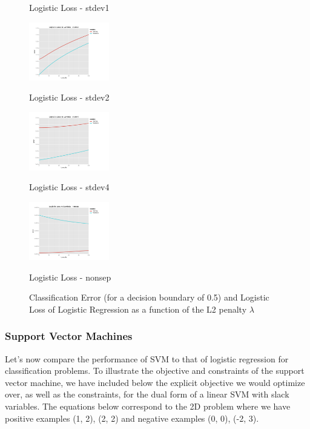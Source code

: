 \documentclass[10pt]{article}
\begin{document}
\begin{figure}[ht]
\begin{minipage}[b]{.24\linewidth}
		\caption*{Logistic Loss - stdev1}
	\end{minipage}
	\begin{minipage}[b]{.24\linewidth}
		\includegraphics[width=1\linewidth, height=1in]{Loss_lambda_stdev2.png}
		\caption*{Logistic Loss - stdev2}
	\end{minipage}
	\begin{minipage}[b]{.24\linewidth}
		\includegraphics[width=1\linewidth, height=1in]{Loss_lambda_stdev4.png}
		\caption*{Logistic Loss - stdev4}
	\end{minipage}
	\begin{minipage}[b]{.24\linewidth}
		\includegraphics[width=1\linewidth, height=1in]{Loss_lambda_nonsep.png}
		\caption*{Logistic Loss - nonsep}
	\end{minipage}
	\caption{Classification Error (for a decision boundary of 0.5) and Logistic Loss of Logistic Regression as a function of the L2 penalty $\lambda$}
\end{figure}


\subsubsection*{Support Vector Machines}

Let's now compare the performance of SVM to that of logistic regression for classification problems. To illustrate the objective and constraints of the support vector machine, we have included below the explicit objective we would optimize over, as well as the constraints, for the dual form of a linear SVM with slack variables. The equations below correspond to the 2D problem where we have positive examples (1, 2), (2, 2) and negative examples (0, 0), (-2, 3).
\end{document}
